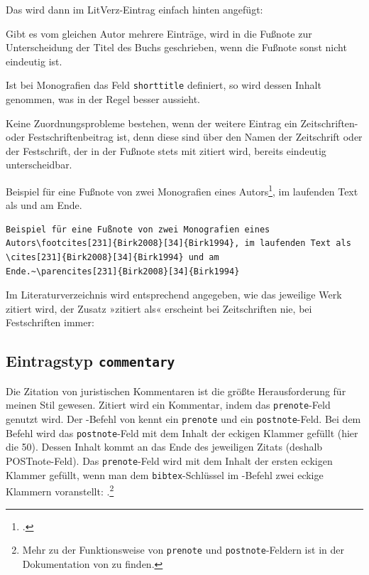 Das wird dann im LitVerz-Eintrag einfach hinten angefügt:

{}


Gibt es vom gleichen Autor mehrere Einträge, wird in die Fußnote zur Unterscheidung der Titel des Buchs 
geschrieben, wenn die Fußnote sonst nicht eindeutig ist. 

Ist bei Monografien das Feld \texttt{shorttitle} definiert, so wird dessen Inhalt genommen, was in der 
Regel besser aussieht. 

Keine Zuordnungsprobleme bestehen, wenn der weitere Eintrag ein Zeitschriften- oder 
Festschriftenbeitrag ist, denn diese sind über den Namen der Zeitschrift oder der Festschrift, der in 
der Fußnote stets mit zitiert wird, bereits eindeutig unterscheidbar.

Beispiel für eine Fußnote von zwei Monografien eines 
Autors\footcites[231]{Birk2008}[34]{Birk1994}, im laufenden Text als \cites[231]{Birk2008}[34]{Birk1994} 
und am Ende.~\parencites[231]{Birk2008}[34]{Birk1994}

\begin{lstlisting}[frame=single,xleftmargin=\fboxsep,xrightmargin=\fboxsep]
Beispiel für eine Fußnote von zwei Monografien eines 
Autors\footcites[231]{Birk2008}[34]{Birk1994}, im laufenden Text als
\cites[231]{Birk2008}[34]{Birk1994} und am 
Ende.~\parencites[231]{Birk2008}[34]{Birk1994}
\end{lstlisting}
Im Literaturverzeichnis wird entsprechend angegeben, wie das jeweilige Werk zitiert wird, der Zusatz 
»zitiert als« erscheint bei Zeitschriften nie, bei Festschriften immer: 

{}


\subsection{Eintragstyp \texttt{commentary}}


Die Zitation von juristischen Kommentaren ist die größte Herausforderung für meinen Stil gewesen.
Zitiert wird ein Kommentar, indem das \texttt{prenote}-Feld genutzt wird. Der -Befehl von 
\bib kennt ein 
\texttt{prenote} und ein \texttt{postnote}-Feld. Bei dem Befehl  wird das 
\texttt{postnote}-Feld mit dem Inhalt der eckigen Klammer gefüllt (hier die 50). Dessen Inhalt kommt 
an das 
Ende des jeweiligen Zitats (deshalb POSTnote-Feld). Das \texttt{prenote}-Feld wird mit dem Inhalt 
der ersten 
eckigen Klammer gefüllt, wenn man dem \texttt{bibtex}-Schlüssel im -Befehl zwei eckige 
Klammern voranstellt:  .\footnote{Mehr zu der 
Funktionsweise von \texttt{prenote} und \texttt{postnote}-Feldern ist in der Dokumentation von \bib 
zu finden.}

